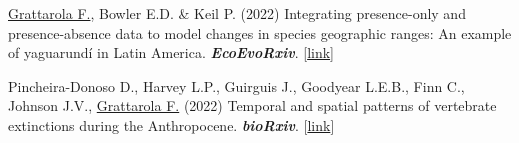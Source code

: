 \documentclass[9pt]{developercv} %
\begin{document}
\begin{etaremune}

\item \underline{Grattarola F.}, Bowler E.D. \& Keil P. (2022) Integrating presence-only and presence-absence data to model changes in species geographic ranges: An example of yaguarundí in Latin America. \textit{\textbf{EcoEvoRxiv}}. [\href{https://doi.org/10.32942/osf.io/67c4u}{link}]

\item Pincheira-Donoso D., Harvey L.P., Guirguis J., Goodyear L.E.B., Finn C., Johnson J.V., \underline{Grattarola F.} (2022) Temporal and spatial patterns of vertebrate extinctions during the Anthropocene. \textit{\textbf{bioRxiv}}. [\href{https://doi.org/10.1101/2022.05.05.490605}{link}]

\end{etaremune}


\end{document}
